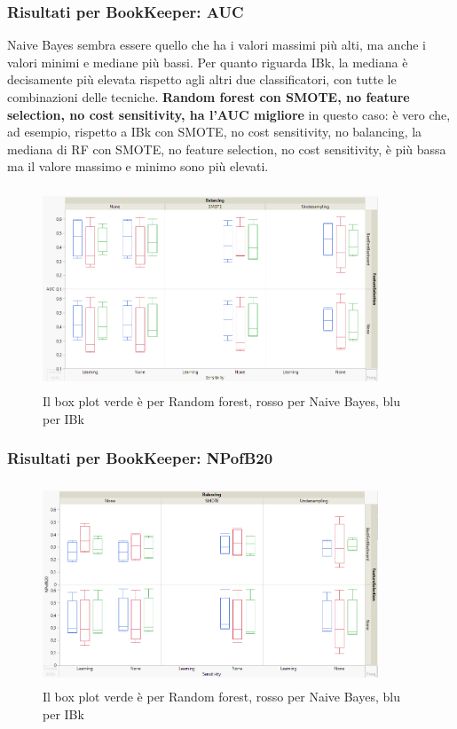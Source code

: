 \documentclass{beamer}
\begin{document}
\begin{frame}
	\frametitle{Risultati per BookKeeper: AUC}
	
	\fontsize{7pt}{8pt}\selectfont
	
	Naive Bayes sembra essere quello che ha i valori massimi più alti, ma anche i
	valori minimi e mediane più bassi.
	Per quanto riguarda IBk, la mediana è decisamente più elevata rispetto agli
	altri due classificatori, con tutte le combinazioni delle tecniche.
	\textbf{Random forest con SMOTE, no feature selection, no cost sensitivity,
	ha l'AUC migliore} in questo caso: è vero che, ad esempio, rispetto
	a IBk con SMOTE, no cost sensitivity, no balancing,
	la mediana di RF con SMOTE, no feature selection, no cost sensitivity,
	è più bassa ma il valore massimo e minimo sono più elevati.
	
	\centering
	\begin{figure}
	\includegraphics[width=10cm, height=6cm]{bookkeeper-auc}
	\caption{Il box plot verde è per Random forest, rosso per Naive Bayes, blu per IBk}
	\end{figure}
\end{frame}

\begin{frame}
	\frametitle{Risultati per BookKeeper: NPofB20}
	
	\centering
	\begin{figure}
	\includegraphics[width=10cm, height=6cm]{bookkeeper-npofb20}
	\caption{Il box plot verde è per Random forest, rosso per Naive Bayes, blu per IBk}
	\end{figure}
\end{frame}
\end{document}
